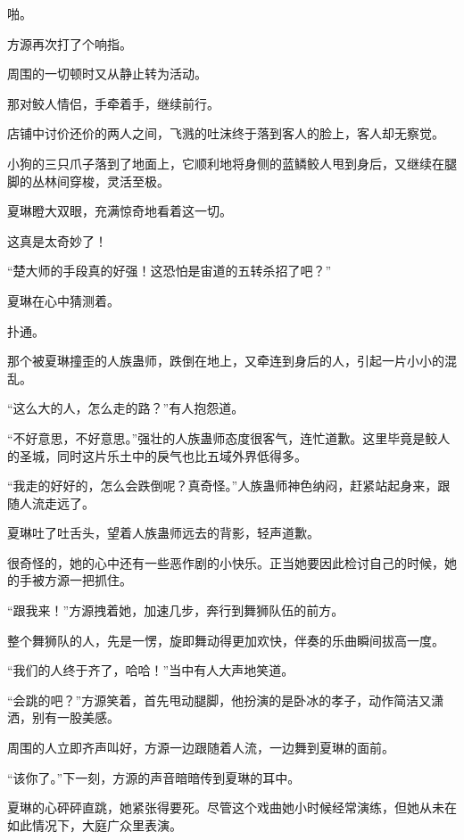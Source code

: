 
\begin{this_body}

啪。

方源再次打了个响指。

周围的一切顿时又从静止转为活动。

那对鲛人情侣，手牵着手，继续前行。

店铺中讨价还价的两人之间，飞溅的吐沫终于落到客人的脸上，客人却无察觉。

小狗的三只爪子落到了地面上，它顺利地将身侧的蓝鳞鲛人甩到身后，又继续在腿脚的丛林间穿梭，灵活至极。

夏琳瞪大双眼，充满惊奇地看着这一切。

这真是太奇妙了！

“楚大师的手段真的好强！这恐怕是宙道的五转杀招了吧？”

夏琳在心中猜测着。

扑通。

那个被夏琳撞歪的人族蛊师，跌倒在地上，又牵连到身后的人，引起一片小小的混乱。

“这么大的人，怎么走的路？”有人抱怨道。

“不好意思，不好意思。”强壮的人族蛊师态度很客气，连忙道歉。这里毕竟是鲛人的圣城，同时这片乐土中的戾气也比五域外界低得多。

“我走的好好的，怎么会跌倒呢？真奇怪。”人族蛊师神色纳闷，赶紧站起身来，跟随人流走远了。

夏琳吐了吐舌头，望着人族蛊师远去的背影，轻声道歉。

很奇怪的，她的心中还有一些恶作剧的小快乐。正当她要因此检讨自己的时候，她的手被方源一把抓住。

“跟我来！”方源拽着她，加速几步，奔行到舞狮队伍的前方。

整个舞狮队的人，先是一愣，旋即舞动得更加欢快，伴奏的乐曲瞬间拔高一度。

“我们的人终于齐了，哈哈！”当中有人大声地笑道。

“会跳的吧？”方源笑着，首先甩动腿脚，他扮演的是卧冰的孝子，动作简洁又潇洒，别有一股美感。

周围的人立即齐声叫好，方源一边跟随着人流，一边舞到夏琳的面前。

“该你了。”下一刻，方源的声音暗暗传到夏琳的耳中。

夏琳的心砰砰直跳，她紧张得要死。尽管这个戏曲她小时候经常演练，但她从未在如此情况下，大庭广众里表演。


\end{this_body}
